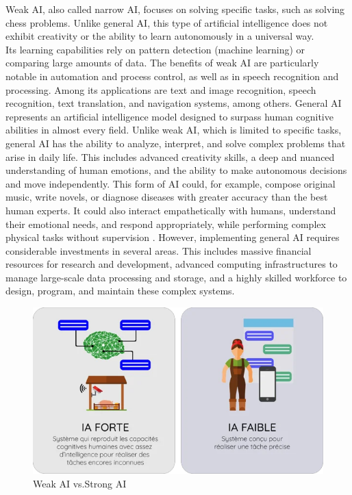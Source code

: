 Weak AI, also called narrow AI, focuses on solving specific tasks, such as solving chess problems. Unlike general AI, this type of artificial intelligence does not exhibit creativity or the ability to learn autonomously in a universal way.\\ Its learning capabilities rely on pattern detection (machine learning) or comparing large amounts of data. The benefits of weak AI are particularly notable in automation and process control, as well as in speech recognition and processing. Among its applications are text and image recognition, speech recognition, text translation, and navigation systems, among others.
General AI represents an artificial intelligence model designed to surpass human cognitive abilities in almost every field. Unlike weak AI, which is limited to specific tasks, general AI has the ability to analyze, interpret, and solve complex problems that arise in daily life. This includes advanced creativity skills, a deep and nuanced understanding of human emotions, and the ability to make autonomous decisions and move independently.
This form of AI could, for example, compose original music, write novels, or diagnose diseases with greater accuracy than the best human experts. It could also interact empathetically with humans, understand their emotional needs, and respond appropriately, while performing complex physical tasks without supervision \cite{elboudkhani2019}.
However, implementing general AI requires considerable investments in several areas. This includes massive financial resources for research and development, advanced computing infrastructures to manage large-scale data processing and storage, and a highly skilled workforce to design, program, and maintain these complex systems.

\begin{figure}[ht!]
    \centering
    \includegraphics[width=0.8\linewidth]{chap1/images/IAFvsIAG.png}
    \caption{Weak AI vs.Strong AI}
    \label{fig:enter-label}
\end{figure}

